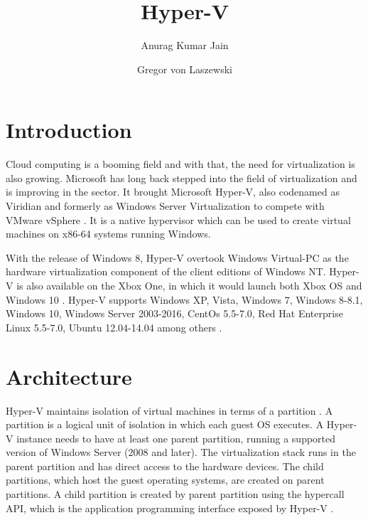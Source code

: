 \documentclass[9pt,twocolumn,twoside]{../../styles/osajnl}
\title{Hyper-V}
\author[1]{Anurag Kumar Jain}
\author[1,*]{Gregor von Laszewski}
\affil[1]{School of Informatics and Computing, Bloomington, IN 47408, U.S.A.}
\affil[*]{Corresponding authors: laszewski@gmail.com}
\begin{document}
\maketitle

\section{Introduction}

Cloud computing is a booming field and with that, the need for
virtualization is also growing. Microsoft has long back stepped into
the field of virtualization and is improving in the sector. It brought
Microsoft Hyper-V, also codenamed as Viridian and formerly as Windows
Server Virtualization to compete with VMware vSphere \CE
\cite{www-hyperv-wikipedia}.
It is a native hypervisor which can be
used to create virtual machines on x86-64 systems running Windows.

With the release of Windows 8, Hyper-V overtook Windows Virtual-PC as
the hardware virtualization component of the client editions of
Windows NT. Hyper-V is also available on the Xbox One, in which it
would launch both Xbox OS and Windows 10
\cite{www-hyperv-wikipedia}. Hyper-V supports Windows XP, Vista,
Windows 7, Windows 8-8.1, Windows 10, Windows Server 2003-2016, CentOs
5.5-7.0, Red Hat Enterprise Linux 5.5-7.0, Ubuntu 12.04-14.04 among
others \cite{www-hyperv-paper2}. \CE
{}

\section{Architecture}

Hyper-V maintains isolation of virtual machines in terms of a
partition \cite{www-hyperv-wikipedia}. A partition is a logical unit
of isolation in which each guest OS executes. A Hyper-V instance needs
to have at least one parent partition, running a supported version of
Windows Server (2008 and later). The virtualization stack runs in the
parent partition and has direct access to the hardware devices. The
child partitions, which host the guest operating systems, are created
on parent partitions. A child partition is created by parent partition
using the hypercall API, which is the application programming
interface exposed by Hyper-V \cite{www-hyperv-architecture}.
\end{document}

